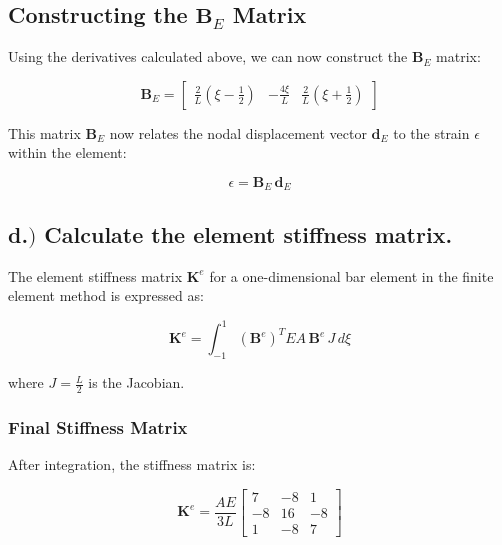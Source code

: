 \subsection*{Constructing the \( \mathbf{B}_E \) Matrix}

Using the derivatives calculated above, we can now construct the \( \mathbf{B}_E \) matrix:

\begin{equation}
    \mathbf{B}_E = \begin{bmatrix} \frac{2}{L} \left( \xi - \frac{1}{2} \right) & -\frac{4\xi}{L} & \frac{2}{L} \left( \xi + \frac{1}{2} \right) \end{bmatrix}
\end{equation}

This matrix \( \mathbf{B}_E \) now relates the nodal displacement vector \( \mathbf{d}_E \) to the strain \( \epsilon \) within the element:

\begin{equation}
    \epsilon = \mathbf{B}_E \, \mathbf{d}_E
\end{equation}

\subsection*{d.$)$ Calculate the element stiffness matrix.}

The element stiffness matrix \( \mathbf{K}^e \) for a one-dimensional bar element in the finite element method is expressed as:

\begin{equation}
    \mathbf{K}^e = \int_{-1}^{1} (\mathbf{B}^e)^T E A \, \mathbf{B}^e \, J \, d\xi
\end{equation}

where \( J = \frac{L}{2} \) is the Jacobian.

\subsubsection*{Final Stiffness Matrix}

After integration, the stiffness matrix is:

\begin{equation}
    \mathbf{K}^e = \frac{A E}{3 L} \begin{bmatrix} 7 & -8 & 1 \\ -8 & 16 & -8 \\ 1 & -8 & 7 \end{bmatrix}
\end{equation}

